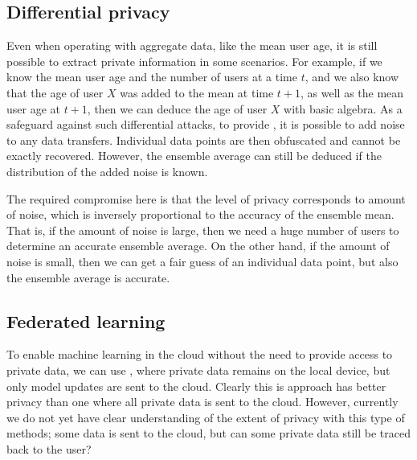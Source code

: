\documentclass[letterpaper,10pt,english]{jupyterBook}
\begin{document}
\subsection{Differential privacy}
\label{\detokenize{Security_and_privacy:differential-privacy}}
\sphinxAtStartPar
Even when operating with aggregate data, like the mean user age, it is
still possible to extract private information in some scenarios. For
example, if we know the mean user age and the number of users at a time
\(t\), and we also know that the age of user \(X\) was added to the mean at
time \(t+1\), as well as the mean user age at \(t+1\), then we can deduce
the age of user \(X\) with basic algebra. As a safeguard against such
differential attacks, to provide , it is
possible to add noise to any data transfers. Individual data points are
then obfuscated and cannot be exactly recovered. However, the ensemble
average can still be deduced if the distribution of the added noise is
known.

\sphinxAtStartPar
The required compromise here is that the level of privacy corresponds to
amount of noise, which is inversely proportional to the accuracy of the
ensemble mean. That is, if the amount of noise is large, then we need a
huge number of users to determine an accurate ensemble average. On the
other hand, if the amount of noise is small, then we can get a fair
guess of an individual data point, but also the ensemble average is
accurate.


\subsection{Federated learning}
\label{\detokenize{Security_and_privacy:federated-learning}}
\sphinxAtStartPar
To enable machine learning in the cloud without the need to provide
access to private data, we can use , where
private data remains on the local device, but only model updates are
sent to the cloud. Clearly this is approach has better privacy than one
where all private data is sent to the cloud. However, currently we do
not yet have clear understanding of the extent of privacy with this type
of methods; some data is sent to the cloud, but can some private data
still be traced back to the user?
\end{document}
